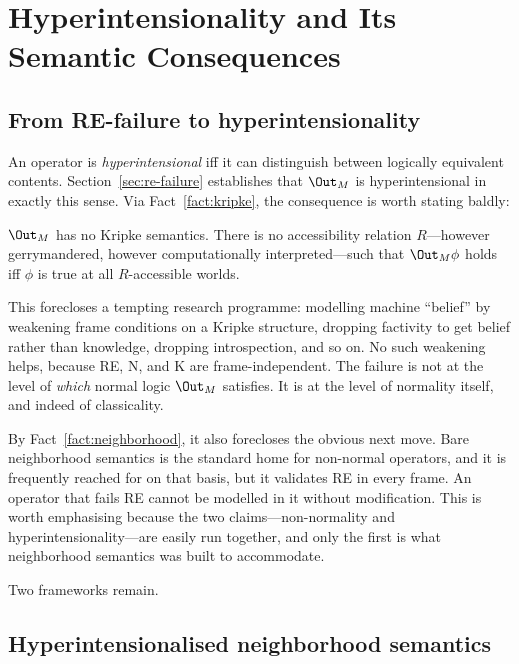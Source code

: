\section{Hyperintensionality and Its Semantic Consequences}
\label{sec:hyperintensionality}

\subsection{From RE-failure to hyperintensionality}

An operator is \emph{hyperintensional} iff it can distinguish between logically
equivalent contents. Section~\ref{sec:re-failure} establishes that $\Out_M$ is
hyperintensional in exactly this sense. Via Fact~\ref{fact:kripke}, the
consequence is worth stating baldly:

\begin{fact}
\label{fact:no-kripke}
$\Out_M$ has no Kripke semantics. There is no accessibility relation
$R$---however gerrymandered, however computationally interpreted---such that
$\Out_M \phi$ holds iff $\phi$ is true at all $R$-accessible worlds.
\end{fact}

This forecloses a tempting research programme: modelling machine ``belief'' by
weakening frame conditions on a Kripke structure, dropping factivity to get
belief rather than knowledge, dropping introspection, and so on. No such
weakening helps, because RE, N, and K are frame-independent. The failure is not
at the level of \emph{which} normal logic $\Out_M$ satisfies. It is at the level
of normality itself, and indeed of classicality.

By Fact~\ref{fact:neighborhood}, it also forecloses the obvious next move. Bare
neighborhood semantics is the standard home for non-normal operators, and it is
frequently reached for on that basis, but it validates RE in every frame. An
operator that fails RE cannot be modelled in it without modification. This is
worth emphasising because the two claims---non-normality and
hyperintensionality---are easily run together, and only the first is what
neighborhood semantics was built to accommodate.

Two frameworks remain.

\subsection{Hyperintensionalised neighborhood semantics}
\label{sec:neighborhood}

